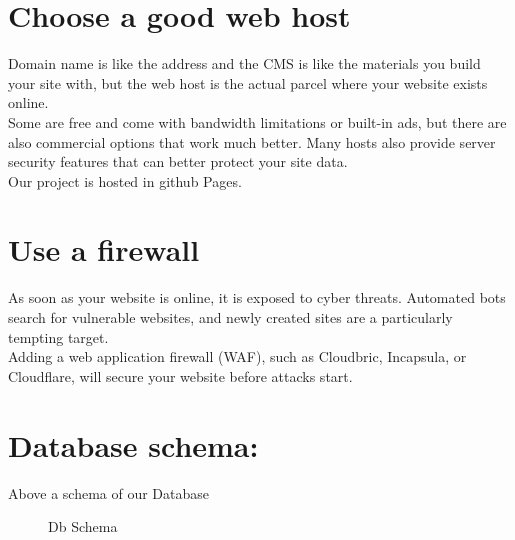 \section{Choose a good web host}
Domain name is like the address and the CMS is like the materials you build your site with, but the web host is the actual parcel where your website exists online.\\
Some are free and come with bandwidth limitations or built-in ads, but there are also commercial options that work much better. Many hosts also provide server security features that can better protect your site data.\\
Our project is hosted in github Pages.


\section{Use a firewall}
As soon as your website is online, it is exposed to cyber threats. Automated bots search for vulnerable websites, and newly created sites are a particularly tempting target.\\

Adding a web application firewall (WAF), such as Cloudbric, Incapsula, or Cloudflare, will secure your website before attacks start.

\newpage
\section{Database schema:}
Above a schema of our Database 

\begin{figure}[!htb]
        \caption{\label{fig:dbschema} Db Schema}
     \end{figure}
\newpage     
